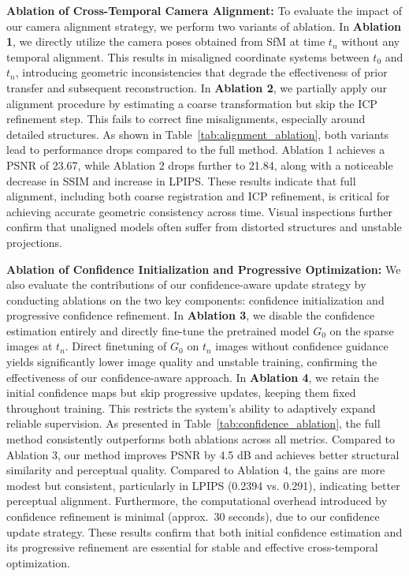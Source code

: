 \documentclass[letterpaper]{article} %
\begin{document}
\textbf{Ablation of Cross-Temporal Camera Alignment:} To evaluate the impact of our camera alignment strategy, we perform two variants of ablation. In \textbf{Ablation 1}, we directly utilize the camera poses obtained from SfM at time $t_n$ without any temporal alignment. This results in misaligned coordinate systems between $t_0$ and $t_n$, introducing geometric inconsistencies that degrade the effectiveness of prior transfer and subsequent reconstruction. In \textbf{Ablation 2}, we partially apply our alignment procedure by estimating a coarse transformation but skip the ICP refinement step. This fails to correct fine misalignments, especially around detailed structures. As shown in Table~\ref{tab:alignment_ablation}, both variants lead to performance drops compared to the full method. Ablation 1 achieves a PSNR of 23.67, while Ablation 2 drops further to 21.84, along with a noticeable decrease in SSIM and increase in LPIPS. These results indicate that full alignment, including both coarse registration and ICP refinement, is critical for achieving accurate geometric consistency across time. Visual inspections further confirm that unaligned models often suffer from distorted structures and unstable projections.

\textbf{Ablation of Confidence Initialization and Progressive Optimization:} We also evaluate the contributions of our confidence-aware update strategy by conducting ablations on the two key components: confidence initialization and progressive confidence refinement. In \textbf{Ablation 3}, we disable the confidence estimation entirely and directly fine-tune the pretrained model $G_0$ on the sparse images at $t_n$. Direct finetuning of $G_0$ on $t_n$ images without confidence guidance yields significantly lower image quality and unstable training, confirming the effectiveness of our confidence-aware approach. In \textbf{Ablation 4}, we retain the initial confidence maps but skip progressive updates, keeping them fixed throughout training. This restricts the system’s ability to adaptively expand reliable supervision. As presented in Table~\ref{tab:confidence_ablation}, the full method consistently outperforms both ablations across all metrics. Compared to Ablation 3, our method improves PSNR by 4.5 dB and achieves better structural similarity and perceptual quality. Compared to Ablation 4, the gains are more modest but consistent, particularly in LPIPS (0.2394 vs. 0.291), indicating better perceptual alignment. Furthermore, the computational overhead introduced by confidence refinement is minimal (approx.~30 seconds), due to our confidence update strategy. These results confirm that both initial confidence estimation and its progressive refinement are essential for stable and effective cross-temporal optimization.
\end{document}
